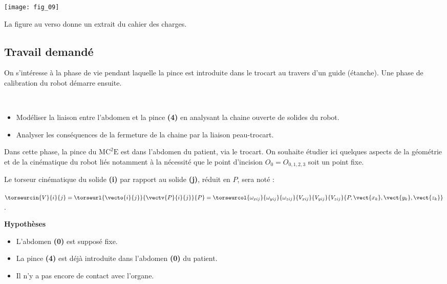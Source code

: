 \begin{center}
\texttt{[image: fig\_09]}
\end{center}


La figure au verso donne un extrait du cahier des charges. 

\fi

\subsection*{Travail demandé}
\ifprof
\else
On s'intéresse à la phase de vie pendant laquelle la pince est introduite dans le trocart au travers d’un guide (étanche). Une phase de calibration du robot démarre ensuite. 
\begin{obj} ~\\
\vspace{-.5cm}
\begin{itemize}
\item Modéliser la liaison entre l’abdomen et la pince \textbf{(4)} en analysant la chaine ouverte de solides du robot.
\item Analyser les conséquences de la fermeture de la chaine par la liaison peau-trocart.
\end{itemize}
\end{obj}

\fi

\ifprof 
\else
Dans cette phase, la pince du $\text{MC}^2\text{E}$ est dans l’abdomen du patient, via le trocart. On souhaite étudier ici quelques aspects de la géométrie et de la cinématique du robot liés notamment à la nécessité que le point d’incision $O_0 =O_{0,1,2,3}$ soit un point fixe.

Le torseur cinématique du solide \textbf{(i)} par rapport au solide \textbf{(j)}, réduit en $P$, sera noté :

$\torseurcin{V}{i}{j}=\torseurl{\vecto{i}{j}}{\vectv{P}{i}{j}}{P}=\torseurcol{\omega_{xij}}{\omega_{yij}}{\omega_{zij}}{V_{xij}}{V_{yij}}{V_{zij}}{P,\vect{x_k},\vect{y_k},\vect{z_k}}$.

\textbf{Hypothèses}

\begin{itemize}
\item L’abdomen \textbf{(0)} est supposé fixe.
\item La pince \textbf{(4)} est déjà introduite dans l’abdomen \textbf{(0)} du patient.
\item Il n’y a pas encore de contact avec l’organe.
\end{itemize}


